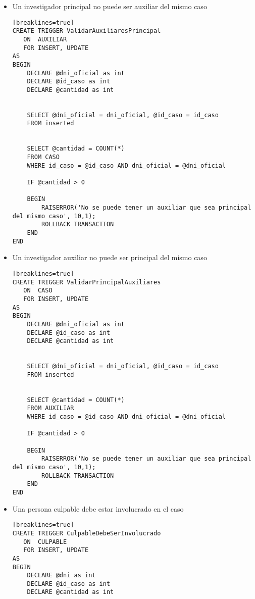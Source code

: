 \begin{itemize}
\begin{verbatim}[breaklines=true]
    SELECT @fechaEvento = fecha_evento, @id_caso = S.id_caso
	FROM inserted I
	INNER JOIN SUCESO S
		ON I.id_evento = S.id_evento


	SELECT @fechaCaso = fecha_ocurrencia
	FROM CASO
	WHERE id_caso = @id_caso

	IF @fechaEvento < @fechaCaso

	BEGIN
		RAISERROR('No se puede tener un evento con fecha menor a la de la ocurrencia del caso', 10,1);
		ROLLBACK TRANSACTION
	END
END
\end{verbatim}

\item Un investigador principal no puede ser auxiliar del mismo caso\\
\begin{verbatim}[breaklines=true]
CREATE TRIGGER ValidarAuxiliaresPrincipal
   ON  AUXILIAR
   FOR INSERT, UPDATE
AS 
BEGIN
	DECLARE @dni_oficial as int
	DECLARE @id_caso as int	
	DECLARE @cantidad as int
	

    SELECT @dni_oficial = dni_oficial, @id_caso = id_caso
	FROM inserted


	SELECT @cantidad = COUNT(*) 
	FROM CASO
	WHERE id_caso = @id_caso AND dni_oficial = @dni_oficial

	IF @cantidad > 0

	BEGIN
		RAISERROR('No se puede tener un auxiliar que sea principal del mismo caso', 10,1);
		ROLLBACK TRANSACTION
	END
END
\end{verbatim}

\item Un investigador auxiliar no puede ser principal del mismo caso\\
\begin{verbatim}[breaklines=true]
CREATE TRIGGER ValidarPrincipalAuxiliares
   ON  CASO
   FOR INSERT, UPDATE
AS 
BEGIN
	DECLARE @dni_oficial as int
	DECLARE @id_caso as int	
	DECLARE @cantidad as int
	

    SELECT @dni_oficial = dni_oficial, @id_caso = id_caso
	FROM inserted


	SELECT @cantidad = COUNT(*) 
	FROM AUXILIAR
	WHERE id_caso = @id_caso AND dni_oficial = @dni_oficial

	IF @cantidad > 0

	BEGIN
		RAISERROR('No se puede tener un auxiliar que sea principal del mismo caso', 10,1);
		ROLLBACK TRANSACTION
	END
END
\end{verbatim}

\item Una persona culpable debe estar involucrado en el caso\\
\begin{verbatim}[breaklines=true]
CREATE TRIGGER CulpableDebeSerInvolucrado
   ON  CULPABLE
   FOR INSERT, UPDATE
AS 
BEGIN
	DECLARE @dni as int
	DECLARE @id_caso as int	
	DECLARE @cantidad as int
	


\end{verbatim}
\end{itemize}
